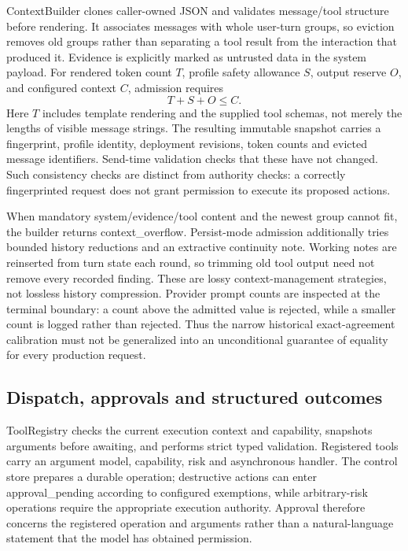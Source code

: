 \documentclass[11pt]{article}
\begin{document}
ContextBuilder clones caller-owned JSON and validates message/tool structure before rendering. It associates messages with whole user-turn groups, so eviction removes old groups rather than separating a tool result from the interaction that produced it. Evidence is explicitly marked as untrusted data in the system payload. For rendered token count $T$, profile safety allowance $S$, output reserve $O$, and configured context $C$, admission requires
\begin{equation}
T + S + O \leq C.
\end{equation}
Here $T$ includes template rendering and the supplied tool schemas, not merely the lengths of visible message strings. The resulting immutable snapshot carries a fingerprint, profile identity, deployment revisions, token counts and evicted message identifiers. Send-time validation checks that these have not changed. Such consistency checks are distinct from authority checks: a correctly fingerprinted request does not grant permission to execute its proposed actions.

When mandatory system/evidence/tool content and the newest group cannot fit, the builder returns context\_overflow. Persist-mode admission additionally tries bounded history reductions and an extractive continuity note. Working notes are reinserted from turn state each round, so trimming old tool output need not remove every recorded finding. These are lossy context-management strategies, not lossless history compression. Provider prompt counts are inspected at the terminal boundary: a count above the admitted value is rejected, while a smaller count is logged rather than rejected. Thus the narrow historical exact-agreement calibration must not be generalized into an unconditional guarantee of equality for every production request.

\subsection{Dispatch, approvals and structured outcomes}
ToolRegistry checks the current execution context and capability, snapshots arguments before awaiting, and performs strict typed validation. Registered tools carry an argument model, capability, risk and asynchronous handler. The control store prepares a durable operation; destructive actions can enter approval\_pending according to configured exemptions, while arbitrary-risk operations require the appropriate execution authority. Approval therefore concerns the registered operation and arguments rather than a natural-language statement that the model has obtained permission.
\end{document}
